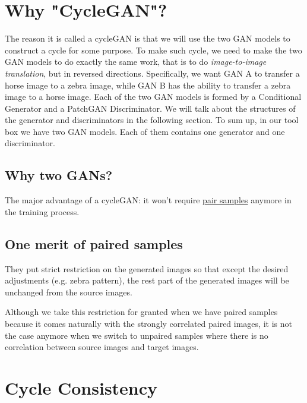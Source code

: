\documentclass[
]{article}
\author{}
\date{}
\begin{document}
\hypertarget{why-cyclegan}{%
\section{Why "CycleGAN"?}\label{why-cyclegan}}

The reason it is called a cycleGAN is that we will use the two GAN
models to construct a cycle for some purpose. To make such cycle, we
need to make the two GAN models to do exactly the same work, that is to
do \emph{image-to-image translation}, but in reversed directions.
Specifically, we want GAN A to transfer a horse image to a zebra image,
while GAN B has the ability to transfer a zebra image to a horse image.
Each of the two GAN models is formed by a Conditional Generator and a
PatchGAN Discriminator. We will talk about the structures of the
generator and discriminators in the following section. To sum up, in our
tool box we have two GAN models. Each of them contains one generator and
one discriminator.

\hypertarget{why-two-gans}{%
\subsection{Why two GANs?}\label{why-two-gans}}

The major advantage of a cycleGAN: it won't require
\protect\hyperlink{one-merit-of-paired-samples}{pair samples} anymore in
the training process.

\hypertarget{one-merit-of-paired-samples}{%
\subsection{One merit of paired
samples}\label{one-merit-of-paired-samples}}

They put strict restriction on the generated images so that except the
desired adjustments (e.g. zebra pattern), the rest part of the generated
images will be unchanged from the source images.

Although we take this restriction for granted when we have paired
samples because it comes naturally with the strongly correlated paired
images, it is not the case anymore when we switch to unpaired samples
where there is no correlation between source images and target images.

\hypertarget{cycle-consistency}{%
\section{\texorpdfstring{Cycle Consistency
}{Cycle Consistency }}\label{cycle-consistency}}
\end{document}
